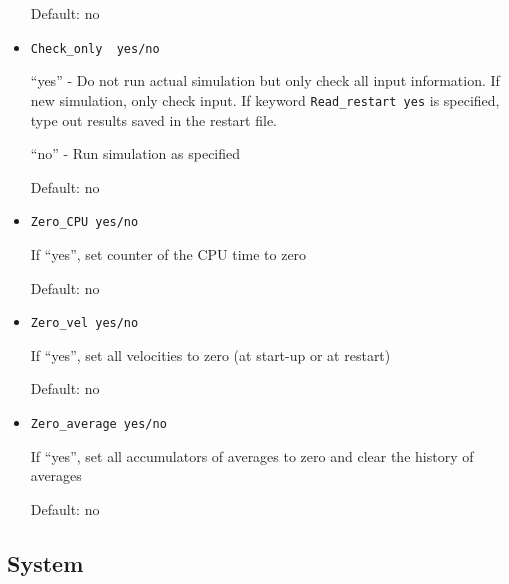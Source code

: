 \documentclass{article}
\begin{document}
\begin{itemize}
Default: no

\item
\verb|Check_only  yes/no|

``yes'' - Do not run actual simulation but only check all input 
information. If new simulation, only check input. If keyword 
\verb|Read_restart yes| is specified, type out results saved in the 
restart file.
 
``no''  - Run simulation as specified

Default: no

\item
\verb|Zero_CPU yes/no|

If ``yes'', set counter of the CPU time to zero

Default: no

\item
\verb|Zero_vel yes/no|

If ``yes'', set all velocities to zero (at start-up or at restart)

Default: no

\item
\verb|Zero_average yes/no|

If ``yes'', set all accumulators of averages to zero and clear the history
of averages

Default: no

\end{itemize}

\subsection{System}
\end{document}
